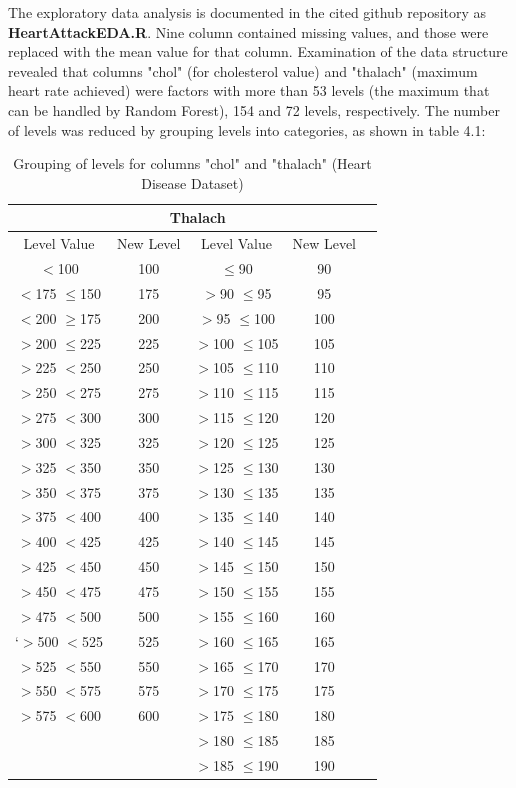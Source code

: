 The exploratory data analysis is documented in the cited github repository as \textbf{HeartAttackEDA.R}.\newline
Nine column contained missing values, and those were replaced with the mean value for that column. Examination of the data structure revealed that columns "chol" (for cholesterol value) and "thalach" (maximum heart rate achieved) were factors with more than 53 levels (the maximum that can be handled by Random Forest), 154 and 72 levels, respectively. The number of levels was reduced by grouping levels into categories, as shown in table 4.1:
\begin{table}[!htbp]
\centering
\begin{tabular}{*5c}
  \hline
  \rowcolor{LightCyan}
  \multicolumn{2}{c}{Cholesterol} & \multicolumn{2}{c}{Thalach} \\
  \hline
  \hline
Level Value & New Level & Level Value & New Level\\ 
  \hline
    $<$100  & 100 & $\leq$90 & 90 \\ 
   $<$175 $\leq$150 & 175 & $>$90 $\leq$95   &  95 \\ 
  $<$200 $\geq$175 & 200 & $>$95 $\leq$100  & 100  \\ 
   $>$200 $\leq$225 & 225 & $>$100 $\leq$105 & 105  \\ 
   $>$225 $<$250  & 250 & $>$105 $\leq$110 & 110  \\ 
   $>$250 $<$275  & 275 & $>$110 $\leq$115 & 115  \\ 
   $>$275 $<$300  & 300 & $>$115 $\leq$120 & 120   \\ 
   $>$300 $<$325  & 325 & $>$120 $\leq$125 & 125   \\ 
   $>$325 $<$350  & 350 & $>$125 $\leq$130 & 130  \\ 
   $>$350 $<$375  & 375 & $>$130 $\leq$135 & 135  \\ 
   $>$375 $<$400  & 400 & $>$135 $\leq$140 & 140 \\ 
   $>$400 $<$425  & 425 & $>$140 $\leq$145 & 145\\ 
   $>$425 $<$450  & 450 & $>$145 $\leq$150 & 150\\ 
   $>$450 $<$475  & 475 & $>$150 $\leq$155 & 155\\ 
   $>$475 $<$500  & 500 & $>$155 $\leq$160 & 160\\ 
  `$>$500 $<$525  & 525 & $>$160 $\leq$165 & 165 \\ 
   $>$525 $<$550  & 550 & $>$165 $\leq$170 & 170 \\ 
   $>$550 $<$575  & 575 & $>$170 $\leq$175 & 175 \\ 
   $>$575 $<$600  & 600 & $>$175 $\leq$180 & 180 \\ 
                  &     & $>$180 $\leq$185 & 185 \\ 
                  &     & $>$185 $\leq$190 & 190 \\ 
   \hline
\end{tabular}
\caption{Grouping of levels for columns "chol" and "thalach" (Heart Disease Dataset)}
\end{table}

